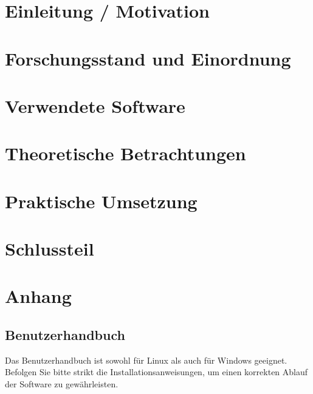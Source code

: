 \documentclass[12pt]{scrreprt}
\theoremstyle{remark}
\begin{document}
\singlespacing
\tableofcontents

\onehalfspacing

\chapter{Einleitung / Motivation}
\label{chap:introduction}


\chapter{Forschungsstand und Einordnung}
\label{chap:forschung}


\chapter{Verwendete Software}
\label{chap:software}


\chapter{Theoretische Betrachtungen}
\label{chap:theorie}



\chapter{Praktische Umsetzung}
\label{chap:praxis}


\chapter{Schlussteil}
\label{chap:ausblick}


%
\printbibliography

\chapter{Anhang}
\section{Benutzerhandbuch} 

Das Benutzerhandbuch ist sowohl für Linux als auch für Windows geeignet. Befolgen Sie bitte strikt die Installationsanweisungen, um einen korrekten Ablauf der Software zu gewährleisten.\\
\end{document}
